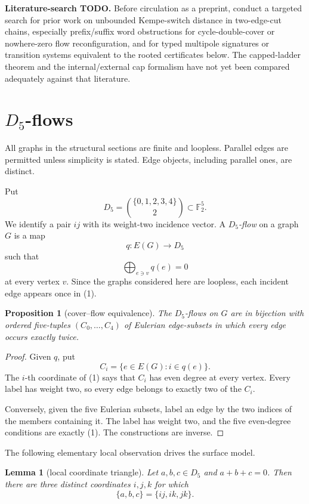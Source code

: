 \documentclass[11pt]{article}
\newtheorem{proposition}[theorem]{Proposition}
\newtheorem{lemma}[theorem]{Lemma}
\theoremstyle{definition}
\theoremstyle{remark}
\newcommand{\F}{\mathbb F}
\newcommand{\Dfive}{D_5}
\begin{document}
\textbf{Literature-search TODO.}
Before circulation as a preprint, conduct a targeted search for prior
work on unbounded Kempe-switch distance in two-edge-cut chains, especially
prefix/suffix word obstructions for cycle-double-cover or nowhere-zero
flow reconfiguration, and for typed multipole signatures or transition
systems equivalent to the rooted certificates below.  The capped-ladder
theorem and the internal/external cap formalism have not yet been compared
adequately against that literature.

\section{\texorpdfstring{\(D_5\)-flows}{D5-flows}}

All graphs in the structural sections are finite and loopless.  Parallel
edges are permitted unless simplicity is stated.  Edge objects, including
parallel ones, are distinct.

Put
\[
 \Dfive=\binom{\{0,1,2,3,4\}}2\subset\F_2^5.
\]
We identify a pair \(ij\) with its weight-two incidence vector.  A
\emph{\(D_5\)-flow} on a graph \(G\) is a map
\[
 q:E(G)\longrightarrow D_5
\]
such that
\[
 \bigoplus_{e\ni v}q(e)=0                                    \tag{1}
\]
at every vertex \(v\).  Since the graphs considered here are loopless,
each incident edge appears once in (1).

\begin{proposition}[cover--flow equivalence]\label{prop:cover-flow}
The \(D_5\)-flows on \(G\) are in bijection with ordered five-tuples
\((C_0,\ldots,C_4)\) of Eulerian edge-subsets in which every edge occurs
exactly twice.
\end{proposition}

\begin{proof}
Given \(q\), put
\[
 C_i=\{e\in E(G):i\in q(e)\}.
\]
The \(i\)-th coordinate of (1) says that \(C_i\) has even degree at every
vertex.  Every label has weight two, so every edge belongs to exactly two
of the \(C_i\).

Conversely, given the five Eulerian subsets, label an edge by the two
indices of the members containing it.  The label has weight two, and the
five even-degree conditions are exactly (1).  The constructions are
inverse.
\end{proof}

The following elementary local observation drives the surface model.

\begin{lemma}[local coordinate triangle]\label{lem:local-triangle}
Let \(a,b,c\in D_5\) and \(a+b+c=0\).  Then there are three distinct
coordinates \(i,j,k\) for which
\[
 \{a,b,c\}=\{ij,ik,jk\}.
\]
\end{lemma}
\end{document}
